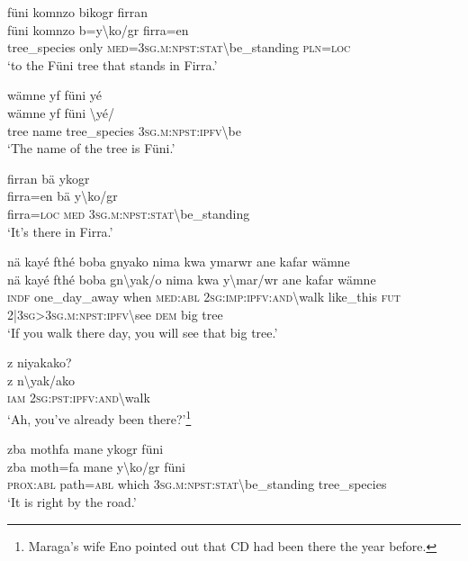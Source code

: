 \ea\label{ex:7:a4763}
füni komnzo bikogr firran\\
\gll füni	komnzo	b=y{\textbackslash}ko/gr	firra=en\\
     tree\_species	only	\textsc{med}=3\textsc{sg}.\textsc{m}:\textsc{npst}:\textsc{stat}{\textbackslash}be\_standing	\textsc{pln}=\textsc{loc}\\
\glt `to the Füni tree that stands in Firra.'
\z

\ea\label{ex:7:a4764}
wämne yf füni yé\\
\gll wämne	yf	füni	{\textbackslash}yé/\\
     tree	name	tree\_species	3\textsc{sg}.\textsc{m}:\textsc{npst}:\textsc{ipfv}{\textbackslash}be\\
\glt `The name of the tree is Füni.'
\z

\ea\label{ex:7:a4766}
firran bä ykogr\\
\gll firra=en	bä	y{\textbackslash}ko/gr\\
     firra=\textsc{loc}	\textsc{med}	3\textsc{sg}.\textsc{m}:\textsc{npst}:\textsc{stat}{\textbackslash}be\_standing\\
\glt `It's there in Firra.'
\z

\ea\label{ex:7:a4767}
nä kayé fthé boba gnyako nima kwa ymarwr ane kafar wämne\\
\gll nä	kayé	fthé	boba	gn{\textbackslash}yak/o	nima	kwa	y{\textbackslash}mar/wr	ane	kafar	wämne\\
     \textsc{indf}	one\_day\_away	when	\textsc{med}:\textsc{abl}	2\textsc{sg}:\textsc{imp}:\textsc{ipfv}:\textsc{and}{\textbackslash}walk	like\_this	\textsc{fut}	2|3\textsc{sg}>3\textsc{sg}.\textsc{m}:\textsc{npst}:\textsc{ipfv}{\textbackslash}see	\textsc{dem}	big	tree\\
\glt `If you walk there day, you will see that big tree.'
\z

\ea\label{ex:7:a4768}
z niyakako?\\
\gll z	n{\textbackslash}yak/ako\\
     \textsc{iam}	2\textsc{sg}:\textsc{pst}:\textsc{ipfv}:\textsc{and}{\textbackslash}walk\\
\glt `Ah, you've already been there?'\footnote{Maraga's wife Eno pointed out that CD had been there the year before.}
\z

\ea\label{ex:7:a4769}
zba mothfa mane ykogr füni\\
\gll zba	moth=fa	mane	y{\textbackslash}ko/gr	füni\\
     \textsc{prox}:\textsc{abl}	path=\textsc{abl}	which	3\textsc{sg}.\textsc{m}:\textsc{npst}:\textsc{stat}{\textbackslash}be\_standing	tree\_species\\
\glt `It is right by the road.'
\z

